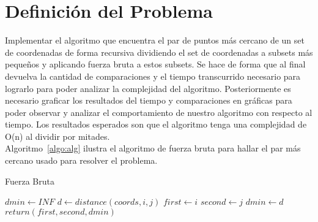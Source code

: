 \section{Definición del Problema}
Implementar el algoritmo que encuentra el par de puntos más cercano de un set de coordenadas de forma recursiva dividiendo el set de coordenadas a subsets más pequeños y aplicando fuerza bruta a estos subsets. Se hace de forma que al final devuelva la cantidad de comparaciones y el tiempo transcurrido necesario para lograrlo para poder analizar la complejidad del algoritmo. Posteriormente es necesario graficar los resultados del tiempo y comparaciones en gráficas para poder observar y analizar el comportamiento de nuestro algoritmo con respecto al tiempo. Los resultados esperados son que el algoritmo tenga una complejidad de O(n) al dividir por mitades. \\

Algoritmo~\ref{algo:alg} ilustra el algoritmo de fuerza bruta para hallar el par más cercano usado para resolver el problema.

\begin{algorithm}[H]	%
	\caption{Fuerza Bruta}	%
	\begin{algorithmic}
    \STATE $dmin \gets INF$
            \STATE $d \gets distance(coords, i, j)$
                \STATE $first \gets i$
                \STATE $second \gets j$
                \STATE $dmin \gets d$
            \ENDIF
        \ENDFOR
    \ENDFOR
    \STATE $return(first, second, dmin)$
	\end{algorithmic}
	\label{algo:alg}	%
\end{algorithm}

